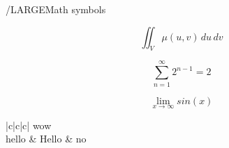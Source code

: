 \documentclass{article}
\begin{document}
/LARGE{Math symbols}

\[
\iint_V \mu(u,v) \, du \, dv
\]

\[
  \sum_{n=1}^{\infty} 2^{n-1} = 2
\]


\[
  \lim_{x \to \infty} sin(x)
\]




\begin{center}
  \begin{tabular}{|c|c|c|}
    \hline
     {wow} \\
    \hline
    hello & Hello & no \\
    \hline
  \end{tabular}
\end{center}
\end{document}
